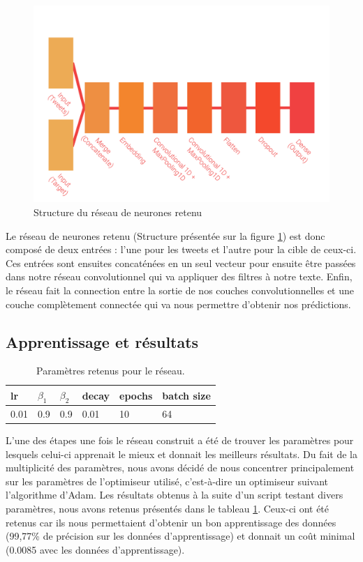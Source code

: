 \begin{figure}
	\centering
	\includegraphics[scale=1.5]{./img/nn.png}
	\caption{Structure du réseau de neurones retenu}
	\label{fig:nn}
\end{figure}

\par Le réseau de neurones retenu (Structure présentée sur la figure \ref{fig:nn}) est donc composé de deux entrées : l'une pour les tweets et l'autre pour la cible de ceux-ci. Ces entrées sont ensuites concaténées en un seul vecteur pour ensuite être passées dans notre réseau convolutionnel qui va appliquer des filtres à notre texte. Enfin, le réseau fait la connection entre la sortie de nos couches convolutionnelles et une couche complètement connectée qui va nous permettre d'obtenir nos prédictions.


\subsection{Apprentissage et résultats}

\begin{table}[h!]
	\centering
	\begin{tabular}{|l|l|l|l|l|l|}
		\hline
		\textbf{lr} & \textbf{$\beta_1$} & \textbf{$\beta_2$} & \textbf{decay} & \textbf{epochs} & \textbf{batch size} \\
		\hline
		0.01 & 0.9 & 0.9 & 0.01 & 10 & 64 \\
		\hline
	\end{tabular}
	\caption{Paramètres retenus pour le réseau.}
	\label{tab:saved_params}
\end{table}

\par L'une des étapes une fois le réseau construit a été de trouver les paramètres pour lesquels celui-ci apprenait le mieux et donnait les meilleurs résultats. Du fait de la multiplicité des paramètres, nous avons décidé de nous concentrer principalement sur les paramètres de l'optimiseur utilisé, c'est-à-dire un optimiseur suivant l'algorithme d'Adam. Les résultats obtenus à la suite d'un script testant divers paramètres, nous avons retenus présentés dans le tableau \ref{tab:saved_params}. Ceux-ci ont été retenus car ils nous permettaient d'obtenir un bon apprentissage des données (99,77\% de précision sur les données d'apprentissage) et donnait un coût minimal (0.0085 avec les données d'apprentissage).

